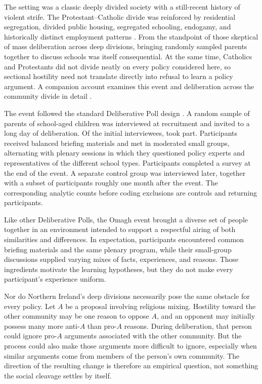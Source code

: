 \documentclass{article}
\begin{document}
The setting was a classic deeply divided society with a still-recent history of violent strife.
The Protestant--Catholic divide was reinforced by residential segregation, divided public
housing, segregated schooling, endogamy, and historically distinct employment patterns
\citep{boyle1994northern,ohara2004self,cohen2007stop,pogatchnik2008despite}. From the
standpoint of those skeptical of mass deliberation across deep divisions, bringing randomly
sampled parents together to discuss schools was itself consequential. At the same time,
Catholics and Protestants did not divide neatly on every policy considered here, so sectional
hostility need not translate directly into refusal to learn a policy argument. A companion
account examines this event and deliberation across the community divide in detail
\citep{luskin2014deep}.

The event followed the standard Deliberative Poll design
\citep{fishkin1991democracy,luskin2002better,luskin2002considered,fishkin2009people}. A random sample of parents of school-aged
children was interviewed at recruitment and invited to a long day of deliberation. Of the
\RecruitmentN{} initial interviewees, \ParticipantTtwoFullN{} took part. Participants received
balanced briefing materials and met in moderated small groups, alternating with plenary
sessions in which they questioned policy experts and representatives of the different school
types. Participants completed a survey at the end of the event. A separate control group was
interviewed later, together with a subset of participants roughly one month after the event.
The corresponding analytic counts before coding exclusions are \ControlFullN{} controls and
\ParticipantTthreeFullN{} returning participants.

Like other Deliberative Polls, the Omagh event brought a diverse set of people together in an
environment intended to support a respectful airing of both similarities and differences. In
expectation, participants encountered common briefing materials and the same plenary program,
while their small-group discussions supplied varying mixes of facts, experiences, and reasons.
Those ingredients motivate the learning hypotheses, but they do not make every participant's
experience uniform.

Nor do Northern Ireland's deep divisions necessarily pose the same obstacle for every policy.
Let $A$ be a proposal involving religious mixing. Hostility toward the other community may be
one reason to oppose $A$, and an opponent may initially possess many more anti-$A$ than
pro-$A$ reasons. During deliberation, that person could ignore pro-$A$ arguments associated
with the other community. But the process could also make those arguments more difficult to
ignore, especially when similar arguments come from members of the person's own community.
The direction of the resulting change is therefore an empirical question, not something the
social cleavage settles by itself.
\end{document}
